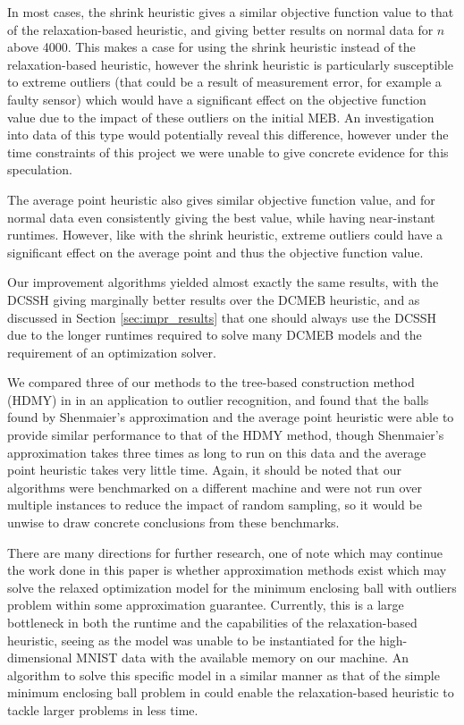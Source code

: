 \documentclass[11pt,twoside]{report}
\theoremstyle{definition}
\numberwithin{theorem}{section}
\numberwithin{definition}{section}
\numberwithin{lemma}{section}
\numberwithin{proposition}{section}
\numberwithin{equation}{section}
\numberwithin{figure}{section}
\begin{document}
In most cases, the shrink heuristic  gives a similar objective function value to that of the relaxation-based heuristic, and giving better results on normal data for $n$ above 4000. This makes a case for using the shrink heuristic instead of the relaxation-based heuristic, however the shrink heuristic is particularly susceptible to extreme outliers (that could be a result of measurement error, for example a faulty sensor) which would have a significant effect on the objective function value due to the impact of these outliers on the initial MEB. An investigation into data of this type would potentially reveal this difference, however under the time constraints of this project we were unable to give concrete evidence for this speculation.

The average point heuristic also gives similar objective function value, and for normal data even consistently giving the best value, while having near-instant runtimes. However, like with the shrink heuristic, extreme outliers could have a significant effect on the average point and thus the objective function value.

Our improvement algorithms yielded almost exactly the same results, with the DCSSH giving marginally better results over the DCMEB heuristic, and as discussed in Section \ref{sec:impr_results} that one should always use the DCSSH due to the longer runtimes required to solve many DCMEB models and the requirement of an optimization solver.

We compared three of our methods to the tree-based construction method (HDMY) in \cite{huding} in an application to outlier recognition, and found that the balls found by Shenmaier's approximation and the average point heuristic were able to provide similar performance to that of the HDMY method, though Shenmaier's approximation takes three times as long to run on this data and the average point heuristic takes very little time. Again, it should be noted that our algorithms were benchmarked on a different machine and were not run over multiple instances to reduce the impact of random sampling, so it would be unwise to draw concrete conclusions from these benchmarks.

There are many directions for further research, one of note which may continue the work done in this paper is whether approximation methods exist which may solve the relaxed optimization model for the minimum enclosing ball with outliers problem within some approximation guarantee. Currently, this is a large bottleneck in both the runtime and the capabilities of the relaxation-based heuristic, seeing as the model was unable to be instantiated for the high-dimensional MNIST data with the available memory on our machine. An algorithm to solve this specific model in a similar manner as that of the simple minimum enclosing ball problem in \cite{two-algorithms} could enable the relaxation-based heuristic to tackle larger problems in less time.
\end{document}
